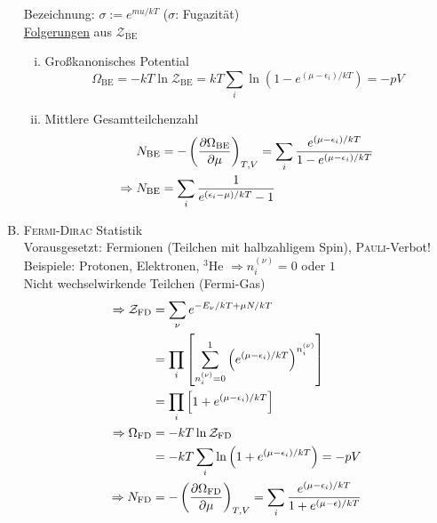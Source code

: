 \begin{enumerate}[A)]
    Bezeichnung: $\sigma := e^{mu / kT}$ ($\sigma$: Fugazität)\\
    \underline{Folgerungen} aus $\mathcal{Z}_\text{BE}$
    \begin{enumerate}[i)]
        \item Großkanonisches Potential
        \begin{equation}
            \Omega_\text{BE} = - k T \ln \mathcal{Z}_\text{BE} = k T \sum_i \ln \left( 1 - e^{(\mu - \epsilon_i) / k T} \right) = - p V
        \end{equation}
        \item Mittlere Gesamtteilchenzahl
        \begin{equation}
            \begin{split}
                N_\text{BE} &= - \left( \frac{\partial \Omega_\text{BE}}{\partial \mu} \right)_{T, V} = \sum_i \frac{e^{(\mu - \epsilon_i) / k T}}{1 - e^{(\mu - \epsilon_i) / k T}} \\
                \Rightarrow N_\text{BE} &= \sum_i \frac{1}{e^{(\epsilon_i - \mu) / k T} - 1}
            \end{split}
        \end{equation}
    \end{enumerate}
    \item \textsc{Fermi-Dirac} Statistik \\
    Vorausgesetzt: Fermionen (Teilchen mit halbzahligem Spin), \textsc{Pauli}-Verbot! \\
    Beispiele: Protonen, Elektronen, $^3$He $\Rightarrow n_i^{(\nu)} = 0$ oder $1$ \\
    Nicht wechselwirkende Teilchen (Fermi-Gas)
    \begin{equation}
        \begin{split}
            \Rightarrow \mathcal{Z}_\text{FD} &= \sum_\nu e^{-E_\nu / k T + \mu N / k T} \\
            &= \prod_i \left[ \sum_{n_i^{(\nu)} = 0}^1 \left( e^{(\mu - \epsilon_i) / k T} \right)^{n_i^{(\nu)}}  \right] \\
            &= \prod_i \left[ 1 + e^{(\mu - \epsilon_i) / k T} \right] \\
            \Rightarrow \Omega_\text{FD} &= - k T \ln \mathcal{Z}_\text{FD} \\
            &= - k T \sum_i \ln \left( 1 + e^{(\mu - \epsilon_i) / kT} \right) = - p V \\
            \Rightarrow N_\text{FD} &= - \pdi{\Omega_\text{FD}}{\mu}{T, V} = \sum_i \frac{e^{(\mu - \epsilon_i) / k T}}{1 + e^{(\mu - \epsilon) / k T}} \\

\end{split}
\end{equation}
\end{enumerate}
